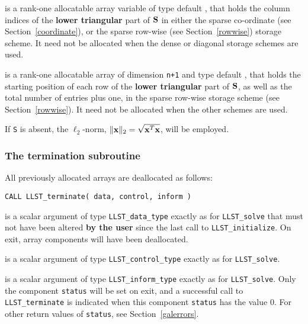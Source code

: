 \documentclass{galahad}
\newcommand{\packagename}{LLST}
\begin{document}
\begin{description}
\begin{description}
 is a rank-one allocatable array variable of type default \integer,
that holds the column indices of the {\bf lower triangular} part of
${\mathbf{S}}$ in either the sparse co-ordinate
(see Section~\ref{coordinate}), or the sparse row-wise
(see Section~\ref{rowwise}) storage scheme.
It need not be allocated when the dense or diagonal storage schemes are used.

 is a rank-one allocatable array of dimension {\tt n+1} and type
default \integer, that holds the starting position of
each row of the {\bf lower triangular} part of ${\mathbf{S}}$, as well
as the total number of entries plus one, in the sparse row-wise storage
scheme (see Section~\ref{rowwise}). It need not be allocated when the
other schemes are used.

\end{description}
If {\tt S} is absent, the $\ell_2$-norm, $\|{\mathbf{x}}\|_2 = \sqrt{{\mathbf{x}}^T {\mathbf{x}}}$,
will be employed.


\end{description}


\subsubsection{The  termination subroutine}
All previously allocated arrays are deallocated as follows:

\hskip0.5in
{\tt CALL \packagename\_terminate( data, control, inform )}

\begin{description}

 is a scalar \intentinout argument of type
{\tt \packagename\_data\_type}
exactly as for
{\tt \packagename\_solve}
that must not have been altered {\bf by the user} since the last call to
{\tt \packagename\_initialize}.
On exit, array components will have been deallocated.

 is a scalar \intentin argument of type
{\tt \packagename\_control\_type}
exactly as for
{\tt \packagename\_solve}.

 is a scalar \intentout argument of type
{\tt \packagename\_inform\_type}
exactly as for
{\tt \packagename\_solve}.
Only the component {\tt status} will be set on exit, and a
successful call to
{\tt \packagename\_terminate}
is indicated when this  component {\tt status} has the value 0.
For other return values of {\tt status}, see Section~\ref{galerrors}.

\end{description}
\end{document}
